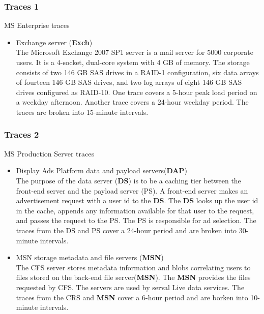 \subsubsection{Traces 1} MS Enterprise traces
 

\begin{itemize}
\item Exchange server (\textbf{Exch}) \\
 The Microsoft Exchange 2007 SP1 server is a mail server
for 5000 corporate users. It is a 4-socket, dual-core system
with 4 GB of memory. The storage consists of two 146 GB
SAS drives in a RAID-1 configuration, six data arrays of
fourteen 146 GB SAS drives, and two log arrays of eight
146 GB SAS drives configured as RAID-10. One trace
covers a 5-hour peak load period on a weekday afternoon.
Another trace covers a 24-hour weekday period. The traces
are broken into 15-minute intervals. 
\end{itemize}

\subsubsection{Traces 2} MS Production Server traces

\begin{itemize}
\item Display Ads Platform data and payload servers(\textbf{DAP}) \\
 The purpose of the data server (\textbf{DS}) is to be a caching tier
between the front-end server and the payload server (PS). A
front-end server makes an advertisement request with a user
id to the \textbf{DS}. The \textbf{DS} looks up the user id in the cache,
appends any information available for that user to the
request, and passes the request to the PS. The PS is
responsible for ad selection. The traces from the DS and PS
cover a 24-hour period and are broken into 30-minute
intervals.
\end{itemize}

\begin{itemize}
\item MSN storage metadata and file servers (\textbf{MSN}) \\
 The CFS server stores metadata information and blobs correlating users to files stored on the back-end file server(\textbf{MSN}). The \textbf{MSN} provides the files requested by CFS. The servers are used by serval Live data services. The traces from the CRS and \textbf{MSN} cover a 6-hour period and are borken into 10-minute intervals.



\end{itemize}



